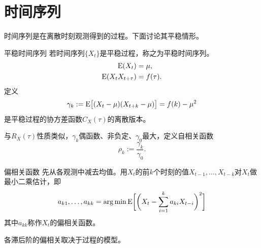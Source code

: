 \section{时间序列}
时间序列是在离散时刻观测得到的过程。下面讨论其平稳情形。
\begin{definition}{平稳时间序列}{}
	若时间序列$\{X_t\}$是平稳过程，称之为平稳时间序列。
	\begin{align*}
		\operatorname{E}(X_t) &= \mu,\\
		\operatorname{E}(X_tX_{t+\tau}) &= f(\tau).
	\end{align*}
	定义
	\begin{equation}\label{eq:ps-time-series-autocovariance}
		\gamma_k := \operatorname{E}\bigl[(X_t - \mu)(X_{t+k} - \mu)\bigr] = f(k) - \mu^2
	\end{equation}
	是平稳过程的协方差函数$C_X(\tau)$的离散版本。
\end{definition}
与$R_X(\tau)$性质类似，$\gamma_k$偶函数、非负定、$\gamma_0$最大，定义自相关函数
\begin{equation}\label{eq:ps-time-series-autocorrelation}
	\rho_k := \frac{\gamma_k}{\gamma_0}.
\end{equation}
\begin{definition}{偏相关函数}{}
	先从各观测中减去均值。用$X_t$的前$k$个时刻的值$X_{t-1},\ldots,X_{t-k}$对$ X_t $做最小二乘估计，即
	\begin{equation}\label{eq:ps-partial-autocorrelation}
		a_{k1},\ldots,a_{kk} = \operatorname*{arg\,min}\operatorname{E}\biggl[\biggl(X_t - \sum_{i=1}^ka_{ki}X_{t-i}\biggr)^2\biggr]
	\end{equation}
	其中$a_{kk}$称作$X_t$的偏相关函数。
\end{definition}
各滞后阶的偏相关取决于过程的模型。
